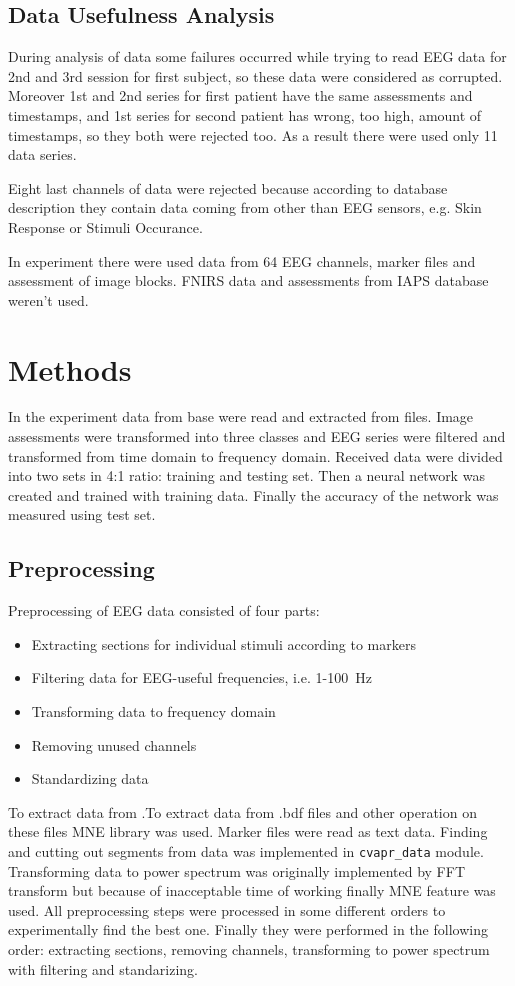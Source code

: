 \documentclass[10pt,journal,compsoc]{IEEEtran}
\begin{document}
\subsection{Data Usefulness Analysis}
During analysis of data some failures occurred while trying to read EEG data for 2nd and 3rd session for first subject, so these data were considered as corrupted. Moreover 1st and 2nd series for first patient have the same assessments and timestamps, and 1st series for second patient has wrong, too high, amount of timestamps, so they both were rejected too. As a result there were used only 11 data series.

Eight last channels of data were rejected because according to database description they contain data coming from other than EEG sensors, e.g. Skin Response or Stimuli Occurance.

In experiment there were used data from 64 EEG channels, marker files and assessment of image blocks. FNIRS data and assessments from IAPS database weren't used.


\section{Methods}
In the experiment data from base were read and extracted from files. Image assessments were transformed into three classes and EEG series were filtered and transformed from time domain to frequency domain. Received data were divided into two sets in 4:1 ratio: training and testing set. Then a neural network was created and trained with training data. Finally the accuracy of the network was measured using test set.

\subsection{Preprocessing}
Preprocessing of EEG data consisted of four parts:
\begin{itemize}
\item{Extracting sections for individual stimuli according to markers}
\item{Filtering data for EEG-useful frequencies, i.e. 1-100~Hz}
\item{Transforming data to frequency domain}
\item{Removing unused channels}
\item{Standardizing data}
\end{itemize}

To extract data from .To extract data from .bdf files and other operation on these files MNE library was used. Marker files were read as text data. Finding and cutting out segments from data was implemented in \texttt{cvapr\_data} module. Transforming data to power spectrum was originally implemented by FFT transform but because of inacceptable time of working finally MNE feature was used. All preprocessing steps were processed in some different orders to experimentally find the best one. Finally they were performed in the following order: extracting sections, removing channels, transforming to power spectrum with filtering and standarizing.
\end{document}

